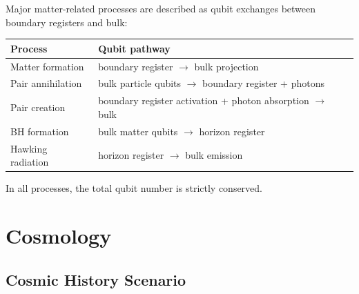 \documentclass[11pt,a4paper]{article}
\begin{document}
Major matter-related processes are described as qubit exchanges between boundary registers and bulk:
\begin{table}[h]
\centering
\begin{tabular}{ll}
\toprule
\textbf{Process} & \textbf{Qubit pathway} \\
\midrule
Matter formation & boundary register $\to$ bulk projection \\
Pair annihilation & bulk particle qubits $\to$ boundary register + photons \\
Pair creation & boundary register activation + photon absorption $\to$ bulk \\
BH formation & bulk matter qubits $\to$ horizon register \\
Hawking radiation & horizon register $\to$ bulk emission \\
\bottomrule
\end{tabular}
\end{table}

In all processes, the total qubit number is strictly conserved.

\section{Cosmology}
\label{sec:cosmology}

\subsection{Cosmic History Scenario}
\end{document}
